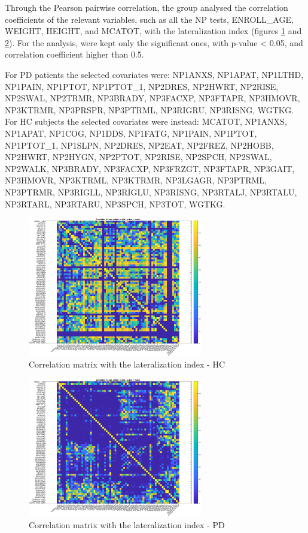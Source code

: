 \documentclass[]{article}
\begin{document}
\begin{multicols}{2}
Through the Pearson pairwise correlation, the group analysed the correlation coefficients of the relevant variables, such as all the NP tests, ENROLL\_AGE, WEIGHT, HEIGHT, and MCATOT, with the lateralization index (figures \ref{fig:corr_mat_hc} and \ref{fig:corr_mat_pd}). For the analysis, were kept only the significant ones, with p-value < 0.05, and correlation coefficient higher than 0.5.

For PD patients the selected covariates were: NP1ANXS, NP1APAT, NP1LTHD, NP1PAIN, NP1PTOT, NP1PTOT\_1, NP2DRES, NP2HWRT, NP2RISE, NP2SWAL, NP2TRMR, NP3BRADY, NP3FACXP, NP3FTAPR, NP3HMOVR, NP3KTRMR, NP3PRSPR, NP3PTRML, NP3RIGRU, NP3RISNG, WGTKG.
For HC subjects the selected covariates were instead: MCATOT, NP1ANXS, NP1APAT, NP1COG, NP1DDS, NP1FATG, NP1PAIN, NP1PTOT, NP1PTOT\_1, NP1SLPN, NP2DRES, NP2EAT, NP2FREZ, NP2HOBB, NP2HWRT, NP2HYGN, NP2PTOT, NP2RISE, NP2SPCH, NP2SWAL, NP2WALK, NP3BRADY, NP3FACXP, NP3FRZGT, NP3FTAPR, NP3GAIT, NP3HMOVR, NP3KTRML, NP3KTRMR, NP3LGAGR, NP3PTRML, NP3PTRMR, NP3RIGLL, NP3RIGLU, NP3RISNG, NP3RTALJ, NP3RTALU, NP3RTARL, NP3RTARU, NP3SPCH, NP3TOT, WGTKG.

\end{multicols}

\begin{figure}[h]
	\centering
	\includegraphics[width=3in]{../correlation_matrix_hc}
	\caption{Correlation matrix with the lateralization index - HC}
	\label{fig:corr_mat_hc}
	
\end{figure} 

\begin{figure}[h]
	\centering
	\includegraphics[width=3in]{../correlation_matrix_pd}
	\caption{Correlation matrix with the lateralization index - PD}
	\label{fig:corr_mat_pd}
	
\end{figure} 
\end{document}
